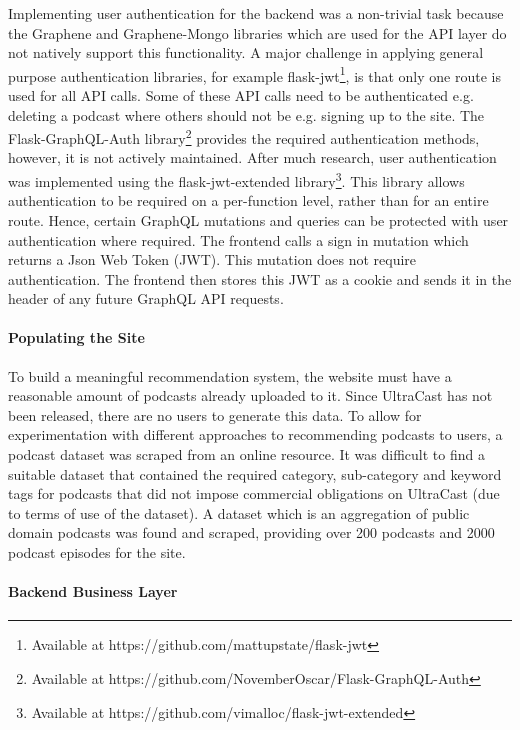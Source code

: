 \documentclass[../report.tex]{subfiles}
\begin{document}
Implementing user authentication for the backend was a non-trivial task because the Graphene and Graphene-Mongo libraries which are used for the API layer do not natively support this functionality.
A major challenge in applying general purpose authentication libraries, for example flask-jwt\footnote{Available at https://github.com/mattupstate/flask-jwt}, is that only one route is used for all API calls.
Some of these API calls need to be authenticated e.g. deleting a podcast where others should not be e.g. signing up to the site.
The Flask-GraphQL-Auth library\footnote{Available at https://github.com/NovemberOscar/Flask-GraphQL-Auth} provides the required authentication methods, however, it is not actively maintained.
After much research, user authentication was implemented using the flask-jwt-extended library\footnote{Available at https://github.com/vimalloc/flask-jwt-extended}.
This library allows authentication to be required on a per-function level, rather than for an entire route.
Hence, certain GraphQL mutations and queries can be protected with user authentication where required.
The frontend calls a sign in mutation which returns a Json Web Token (JWT).
This mutation does not require authentication.
The frontend then stores this JWT as a cookie and sends it in the header of any future GraphQL API requests.

\paragraph{Populating the Site}

To build a meaningful recommendation system, the website must have a reasonable amount of podcasts already uploaded to it.
Since UltraCast has not been released, there are no users to generate this data.
To allow for experimentation with different approaches to recommending podcasts to users, a podcast dataset was scraped from an online resource.
It was difficult to find a suitable dataset that contained the required category, sub-category and keyword tags for podcasts that did not impose commercial obligations on UltraCast (due to terms of use of the dataset).
A dataset which is an aggregation of public domain podcasts was found and scraped, providing over 200 podcasts and 2000 podcast episodes for the site.

\paragraph{Backend Business Layer}
\end{document}
